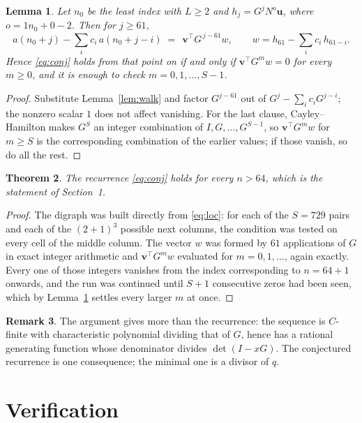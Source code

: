 \documentclass[11pt,a4paper]{article}
\theoremstyle{plain}
\newtheorem{theorem}{Theorem}
\newtheorem{lemma}[theorem]{Lemma}
\theoremstyle{definition}
\newtheorem{remark}[theorem]{Remark}
\begin{document}
\begin{lemma}\label{lem:crit}
Let $n_0$ be the least index with $L\ge2$ and $h_j=G^{j}N^{o}\mathbf{u}$, where
$o=1n_0+0-2$. Then for $j\ge61$,
\[
a(n_0+j)-\sum_i c_i\,a(n_0+j-i)\;=\;\,\mathbf{v}^{\!\top}G^{\,j-61}w,
\qquad w=h_{61}-\sum_i c_i\,h_{61-i} .
\]
Hence \eqref{eq:conj} holds from that point on if and only if
$\mathbf{v}^{\!\top}G^{m}w=0$ for every $m\ge0$, and it is enough to check
$m=0,1,\dots,S-1$.
\end{lemma}

\begin{proof}
Substitute Lemma~\ref{lem:walk} and factor $G^{j-61}$ out of
$G^{j}-\sum_ic_iG^{j-i}$; the nonzero scalar $1$ does not affect
vanishing. For the last clause, Cayley--Hamilton makes $G^{S}$ an integer combination of
$I,G,\dots,G^{S-1}$, so $\mathbf{v}^{\!\top}G^{m}w$ for $m\ge S$ is the corresponding
combination of the earlier values; if those vanish, so do all the rest.
\end{proof}

\begin{theorem}
The recurrence \eqref{eq:conj} holds for every $n>64$, which is the statement of
Section~1.
\end{theorem}

\begin{proof}
The digraph was built directly from \eqref{eq:loc}: for each of the $S=729$ pairs and each
of the $(2+1)^{3}$ possible next columns, the condition was tested on every cell of
the middle column. The vector $w$ was formed by $61$ applications of $G$ in exact integer
arithmetic and $\mathbf{v}^{\!\top}G^{m}w$ evaluated for $m=0,1,\dots$, again exactly.
Every one of those integers vanishes from the index corresponding to $n=64+1$ onwards,
and the run was continued until $S+1$ consecutive zeros had been seen, which by
Lemma~\ref{lem:crit} settles every larger $m$ at once.
\end{proof}

\begin{remark}
The argument gives more than the recurrence: the sequence is $C$-finite with characteristic
polynomial dividing that of $G$, hence has a rational generating function whose denominator
divides $\det(I-xG)$. The conjectured recurrence is one consequence; the minimal one is a
divisor of $q$.
\end{remark}

\section{Verification}
\end{document}
